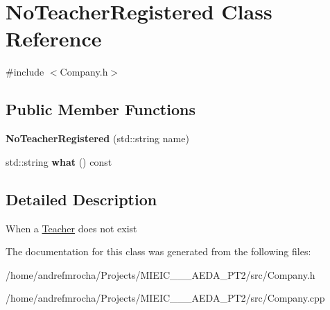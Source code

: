 \hypertarget{class_no_teacher_registered}{}\section{No\+Teacher\+Registered Class Reference}
\label{class_no_teacher_registered}


{\ttfamily \#include $<$Company.\+h$>$}

\subsection*{Public Member Functions}
\begin{DoxyCompactItemize}
\item 
\mbox{\label{class_no_teacher_registered_a1a79ff4c2def6524d60937297fa27ed3}} 
{\bfseries No\+Teacher\+Registered} (std\+::string name)
\item 
\mbox{\label{class_no_teacher_registered_af81eb37b6a596d865c3a63d9900345a1}} 
std\+::string {\bfseries what} () const
\end{DoxyCompactItemize}


\subsection{Detailed Description}
When a \mbox{\hyperlink{class_teacher}{Teacher}} does not exist 

The documentation for this class was generated from the following files\+:\begin{DoxyCompactItemize}
\item 
/home/andrefmrocha/\+Projects/\+M\+I\+E\+I\+C\+\_\+\_\+\_\+\+A\+E\+D\+A\+\_\+\+P\+T2/src/Company.\+h\item 
/home/andrefmrocha/\+Projects/\+M\+I\+E\+I\+C\+\_\+\_\+\_\+\+A\+E\+D\+A\+\_\+\+P\+T2/src/Company.\+cpp\end{DoxyCompactItemize}
